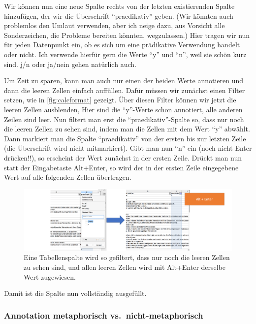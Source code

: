 \documentclass[]{article}
\begin{document}
Wir können nun eine neue Spalte rechts von der letzten existierenden
Spalte hinzufügen, der wir die Überschrift ``praedikativ'' geben. (Wir
könnten auch problemlos den Umlaut verwenden, aber ich neige dazu, aus
Vorsicht alle Sonderzeichen, die Probleme bereiten könnten,
wegzulassen.) Hier tragen wir nun für jeden Datenpunkt ein, ob es sich
um eine prädikative Verwendung handelt oder nicht. Ich verwende hierfür
gern die Werte ``y'' und ``n'', weil sie schön kurz sind. j/n oder
ja/nein gehen natürlich auch.

Um Zeit zu sparen, kann man auch nur einen der beiden Werte annotieren
und dann die leeren Zellen einfach auffüllen. Dafür müssen wir zunächst
einen Filter setzen, wie in \ref{fig:calcformat} gezeigt. Über diesen
Filter können wir jetzt die leeren Zellen ausblenden, Hier sind die
``y''-Werte schon annotiert, alle anderen Zeilen sind leer. Nun filtert
man erst die ``praedikativ''-Spalte so, dass nur noch die leeren Zellen
zu sehen sind, indem man die Zellen mit dem Wert ``y'' abwählt. Dann
markiert man die Spalte ``praedikativ'' von der ersten bis zur letzten
Zeile (die Überschrift wird nicht mitmarkiert). Gibt man nun ``n'' ein
(noch nicht Enter drücken!!), so erscheint der Wert zunächst in der
ersten Zeile. Drückt man nun statt der Eingabetaste Alt+Enter, so wird
der in der ersten Zeile eingegebene Wert auf alle folgenden Zellen
übertragen.

\begin{figure}
\includegraphics[width=6.66in]{fig/calc_bulkchange} \caption{Eine Tabellenspalte wird so gefiltert, dass nur noch die leeren Zellen zu sehen sind, und allen leeren Zellen wird mit Alt+Enter derselbe Wert zugewiesen.}\label{fig:calcbulkchange}
\end{figure}

Damit ist die Spalte nun vollständig ausgefüllt.

\subsubsection{Annotation metaphorisch
vs.~nicht-metaphorisch}\label{annotation-metaphorisch-vs.nicht-metaphorisch}
\end{document}
